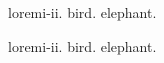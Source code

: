 \documentclass{article}
\begin{document}
\gls{loremi-ii}. \gls{bird}. \gls{elephant}.

\newpage
\gls{loremi-ii}. \gls{bird}. \gls{elephant}.

\printunsrtglossaries
\end{document}
